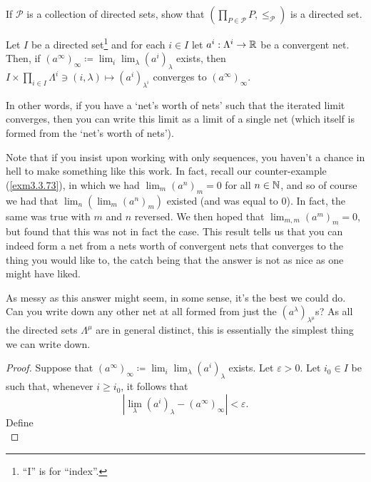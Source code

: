 \begin{exr}
If $\mathcal{P}$ is a collection of directed sets, show that $(\prod _{P\in \mathcal{P}}P,\leq _{\mathcal{P}})$ is a directed set.
\end{exr}
\begin{prp}\label{prp3.3.154}
Let $I$ be a directed set\footnote{``I'' is for ``index''.} and for each $i\in I$ let $a^i:\Lambda ^i\rightarrow \mathbb{R}$ be a convergent net.  Then, if $(a^\infty )_\infty \coloneqq \lim _i\lim _\lambda (a^i)_\lambda$ exists, then $I\times \prod _{i\in I}\Lambda ^i\ni (i,\lambda )\mapsto (a^i)_{\lambda ^i}$ converges to $(a^\infty )_\infty$.
\begin{rmk}
In other words, if you have a `net's worth of nets' such that the iterated limit converges, then you can write this limit as a limit of a single net (which itself is formed from the `net's worth of nets').
\end{rmk}
\begin{rmk}
Note that if you insist upon working with only sequences, you haven't a chance in hell to make something like this work.  In fact, recall our counter-example (\cref{exm3.3.73}), in which we had $\lim _m (a^n)_m=0$ for all $n\in \mathbb{N}$, and so of course we had that $\lim _n\left( \lim _m(a^n)_m\right)$ existed (and was equal to $0$).  In fact, the same was true with $m$ and $n$ reversed.  We then hoped that $\lim _{m,m}(a^m)_m=0$, but found that this was not in fact the case.  This result tells us that you can indeed form a net from a nets worth of convergent nets that converges to the thing you would like to, the catch being that the answer is not as nice as one might have liked.
\end{rmk}
\begin{rmk}
As messy as this answer might seem, in some sense, it's the best we could do.  Can you write down any other net at all formed from just the $(a^\lambda )_{\lambda ^\mu}$s?  As all the directed sets $\Lambda ^\mu$ are in general distinct, this is essentially the simplest thing we can write down.
\end{rmk}
\begin{proof}
Suppose that $(a^\infty )_\infty \coloneqq \lim _i\lim _\lambda (a^i)_\lambda$ exists.  Let $\varepsilon >0$.  Let $i_0\in I$ be such that, whenever $i\geq i_0$, it follows that
\begin{equation}
\left| \lim _\lambda (a^i)_\lambda -(a^\infty )_\infty \right| <\varepsilon .
\end{equation}
Define
\begin{equation}

\end{equation}
\end{proof}
\end{prp}
